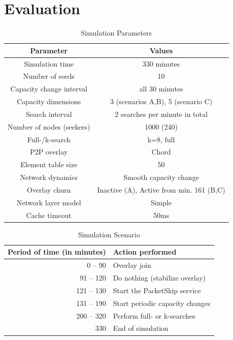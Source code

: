 \section{Evaluation}
\label{sec:evaluation}

\begin{table}[t]
  \caption{Simulation Parameters}
  \label{tab:eval_param}
  \centering
  \begin{tabular}{|c|c|}
  \hline
  \textbf{Parameter}       & \textbf{Values} \\
  \hline
  \hline
  Simulation time          & 330 minutes \\
  \hline
  Number of seeds          & 10 \\
  \hline
  Capacity change interval & all 30 minutes \\
  \hline
  Capacity dimensions      & 3 (scenarios A,B), 5 (scenario C) \\
  \hline
  Search interval          & 2 searches per minute in total \\
  \hline
  Number of nodes (seekers) & 1000 (240) \\
  \hline
  Full-/k-search           & k=8, full \\
  \hline
  P2P overlay              & Chord \\
  \hline
  Element table size       & 50 \\
  \hline
  Network dynamics         & Smooth capacity change \\
  \hline
  Overlay churn            & Inactive (A), Active from min. 161 (B,C)\\
  \hline
  Network layer model      & Simple \\
  \hline
  Cache timeout            & 50ms \\
  \hline
  \end{tabular}
\end{table}

\begin{table}[t]
  \caption{Simulation Scenario}
  \label{tab:eval_scenario}
  \centering
  \begin{tabular}{|r|l|}
  \hline
  \textbf{Period of time (in minutes)} & \textbf{Action performed} \\
  \hline
  \hline
  0 -- 90 & Overlay join\\
  \hline
  91 -- 120 & Do nothing (stabilize overlay) \\
  \hline
  121 -- 130 & Start the PacketSkip service \\
  \hline
  131 -- 190 & Start periodic capacity changes \\
  \hline
      200 -- 320 & Perform full- or k-searches \\
  \hline
      330 & End of simulation \\
  \hline
  \end{tabular}
\end{table}




